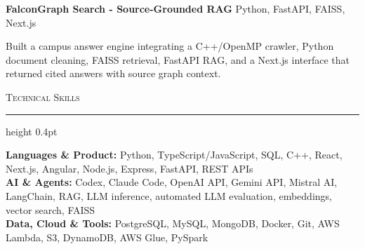 \documentclass[letterpaper,11pt]{article}
\newcommand{\resumesection}[1]{%
  \par\vspace{2pt}%
  {\large\scshape #1}\par\vspace{2pt}%
  \hrule height 0.4pt\vspace{2pt}%
}
\newcommand{\projectHeading}[2]{
  \textbf{#1} \hfill #2
}
\begin{document}
\projectHeading{FalconGraph Search - Source-Grounded RAG}{Python, FastAPI, FAISS, Next.js}
\begin{tightitemize}
  \item Built a campus answer engine integrating a C++/OpenMP crawler, Python document cleaning, FAISS retrieval, FastAPI RAG, and a Next.js interface that returned cited answers with source graph context.
\end{tightitemize}

\resumesection{Technical Skills}
\textbf{Languages \& Product:} Python, TypeScript/JavaScript, SQL, C++, React, Next.js, Angular, Node.js, Express, FastAPI, REST APIs\\
\textbf{AI \& Agents:} Codex, Claude Code, OpenAI API, Gemini API, Mistral AI, LangChain, RAG, LLM inference, automated LLM evaluation, embeddings, vector search, FAISS\\
\textbf{Data, Cloud \& Tools:} PostgreSQL, MySQL, MongoDB, Docker, Git, AWS Lambda, S3, DynamoDB, AWS Glue, PySpark
\end{document}
